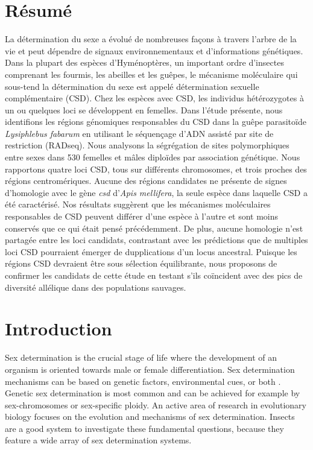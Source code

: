 \documentclass[11pt,a4paper]{report}
\begin{document}
\section{Résumé}
La détermination du sexe a évolué de nombreuses façons à travers l'arbre de la vie et peut dépendre de signaux environnementaux et d'informations génétiques. Dans la plupart des espèces d'Hyméno\-ptères, un important ordre d'insectes comprenant les fourmis, les abeilles et les guêpes, le mécanisme moléculaire qui sous-tend la détermination du sexe est appelé détermination sexuelle complémentaire (CSD). Chez les espèces avec CSD, les individus hétérozygotes à un ou quelques loci se développent en femelles. Dans l'étude présente, nous identifions les régions génomiques responsables du CSD dans la guêpe parasitoïde \textit{Lysiphlebus fabarum} en utilisant le séquençage d'ADN assisté par site de restriction (RADseq). Nous analysons la ségrégation de sites polymorphiques entre sexes dans 530 femelles et mâles diploïdes par association génétique. Nous rapportons quatre loci CSD, tous sur différents chromosomes, et trois proches des régions centromériques. Aucune des régions candidates ne présente de signes d'homologie avec le gène \textit{csd} d'\textit{Apis mellifera}, la seule espèce dans laquelle CSD a été caractérisé. Nos résultats suggèrent que les mécanismes moléculaires responsables de CSD peuvent différer d'une espèce à l'autre et sont moins conservés que ce qui était pensé précédemment. De plus, aucune homologie n'est partagée entre les loci candidats, contrastant avec les prédictions que de multiples loci CSD pourraient émerger de dupplications d'un locus ancestral. Puisque les régions CSD devraient être sous sélection équilibrante, nous proposons de confirmer les candidats de cette étude en testant s'ils coïncident avec des pics de diversité allélique dans des populations sauvages.

\section{Introduction}
Sex determination is the crucial stage of life where the development of an organism is oriented towards male or female differentiation. Sex determination mechanisms can be based on genetic factors, environmental cues, or both \citep{Beukeboom2014EvolSexDetBook}. Genetic sex determination is most common \citep{Bachtrog2014SexIt} and can be achieved for example by sex-chromosomes or sex-specific ploidy. An active area of research in evolutionary biology focuses on the evolution and mechanisms of sex determination. Insects are a good system to investigate these fundamental questions, because they feature a wide array of sex determination systems. 
\end{document}
